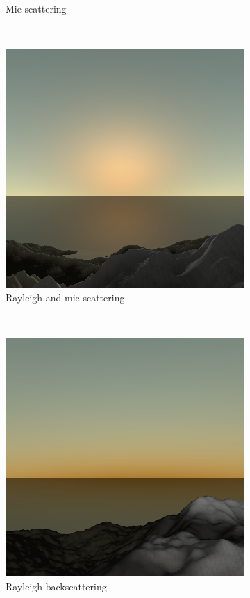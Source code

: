 \documentclass{article}
\begin{document}
\begin{figure}[H]
\begin{subfigure}[b]{0.45\textwidth}
        \caption{Mie scattering}
        \label{fig:scatterMie}
    \end{subfigure}
    ~
    \begin{subfigure}[b]{0.45\textwidth}
        \centering
        \includegraphics[scale=0.25]{scatterRayleighMie}
        \caption{Rayleigh and mie scattering}
        \label{fig:scatterRayleighMie}
    \end{subfigure}
    ~
    \begin{subfigure}[b]{0.45\textwidth}
        \centering
        \includegraphics[scale=0.25]{scatterBack}
        \caption{Rayleigh backscattering}
        \label{fig:scatterBack}
    \end{subfigure}
    \caption{}
    \label{fig:sunScatterResults}
\end{figure}
\end{document}
